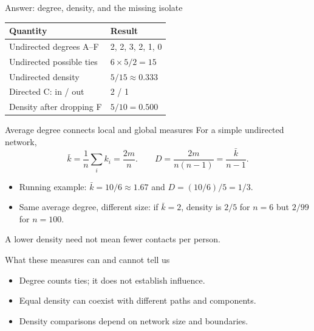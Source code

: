 \documentclass[aspectratio=169,11pt]{beamer}
\begin{document}
\begin{frame}{Answer: degree, density, and the missing isolate}
\begin{center}
\renewcommand{\arraystretch}{1.3}
\begin{tabular}{ll}
\toprule
Quantity & Result \\
\midrule
Undirected degrees A--F & 2, 2, 3, 2, 1, 0 \\
Undirected possible ties & $6\times5/2=15$ \\
Undirected density & $5/15\approx0.333$ \\
Directed C: in / out & 2 / 1 \\
Density after dropping F & $5/10=0.500$ \\
\bottomrule
\end{tabular}
\end{center}

\end{frame}

\begin{frame}{Average degree connects local and global measures}
For a simple undirected network,
\[\bar{k}=\frac{1}{n}\sum_i k_i=\frac{2m}{n}.
\qquad D=\frac{2m}{n(n-1)}=\frac{\bar{k}}{n-1}.\]
\begin{itemize}
\item Running example: $\bar{k}=10/6\approx1.67$ and $D=(10/6)/5=1/3$.
\medskip
\item Same average degree, different size: if $\bar{k}=2$, density is $2/5$ for $n=6$ but $2/99$ for $n=100$.
\end{itemize}
\medskip
\textcolor{accent}{A lower density need not mean fewer contacts per person.}
\end{frame}

\begin{frame}{What these measures can and cannot tell us}
\begin{itemize}
\item Degree counts ties; it does not establish influence.
\medskip
\item Equal density can coexist with different paths and components.
\medskip
\item Density comparisons depend on network size and boundaries.
\medskip
\end{itemize}

\end{frame}
\end{document}
